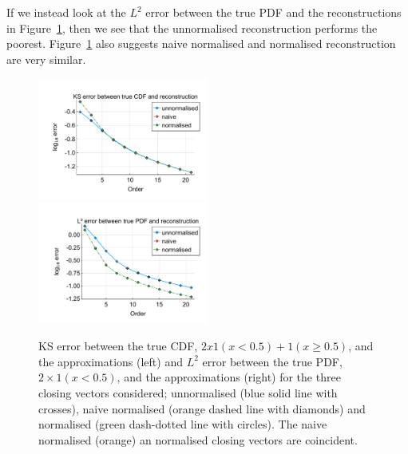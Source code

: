 If we instead look at the \(L^2\) error between the true PDF and the reconstructions in Figure~\ref{fig: fun 2 ks error qbdrap closing vecs}, then we see that the unnormalised reconstruction performs the poorest. Figure~\ref{fig: fun 2 ks error qbdrap closing vecs} also suggests naive normalised and normalised reconstruction are very similar. 
\begin{figure}
	\centering
	\includegraphics[width=0.5\textwidth,trim={1.25cm 0.8cm 0.25cm 1.25cm},clip]{chapter5/figs/qbdrap_closing_vec/fun2/ks_error_formatted.pdf}%
	\includegraphics[width=0.5\textwidth,trim={1.25cm 0.8cm 0.25cm 1.25cm},clip]{chapter5/figs/qbdrap_closing_vec/fun2/l2_pdf_error_formatted.pdf}
	\caption{KS error between the true CDF, \(2x1(x<0.5)+1(x\geq 0.5)\), and the approximations (left) and \(L^2\) error between the true PDF, \(2\times 1(x<0.5)\), and the approximations (right) for the three closing vectors considered; unnormalised (blue solid line with crosses), naive normalised (orange dashed line with diamonds) and normalised (green dash-dotted line with circles). The naive normalised (orange) an normalised closing vectors are coincident.}
	\label{fig: fun 2 ks error qbdrap closing vecs}
\end{figure}

